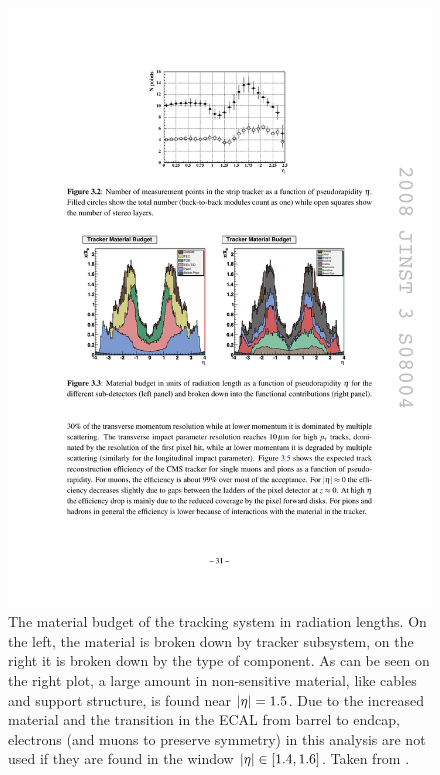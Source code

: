     \begin{figure}[h!]
      \centering
      \includegraphics[width=.9\textwidth]{figures/cms_tracker_material_budget.pdf}
      \caption[The material budget of the tracking system in radiation lengths.]{The material budget of the tracking system in radiation lengths. On the left, the material is broken down by tracker subsystem, on the right it is broken down by the type of component. As can be seen on the right plot, a large amount in non-sensitive material, like cables and support structure, is found near $\lvert \eta \rvert=1.5$. Due to the increased material and the transition in the ECAL from barrel to endcap, electrons (and muons to preserve symmetry) in this analysis are not used if they are found in the window $\lvert \eta \rvert \in [1.4,1.6]$. Taken from \cite{cms_jinst}.}
      \label{fig:tracker_material_budget}
    \end{figure}

